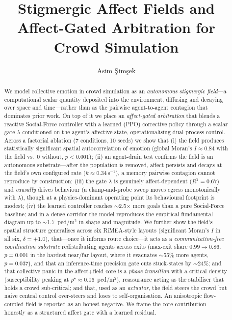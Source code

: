 \documentclass[sigconf,nonacm]{acmart}
\begin{document}
\title{Stigmergic Affect Fields and Affect-Gated Arbitration for Crowd Simulation}
\author{Asim \c{S}im\c{s}ek}
\affiliation{\institution{[Affiliation]}\country{}}
\renewcommand{\shortauthors}{\c{S}im\c{s}ek}
\begin{abstract}
We model collective emotion in crowd simulation as an \emph{autonomous stigmergic field}---a
computational scalar quantity deposited into the environment, diffusing and decaying over space and
time---rather than as the pairwise agent-to-agent contagion that dominates prior work. On top of it
we place an \emph{affect-gated arbitration} that blends a reactive Social-Force controller with a
learned (PPO) corrective policy through a scalar gate $\lambda$ conditioned on the agent's affective
state, operationalising dual-process control. Across a factorial ablation (7 conditions, 10 seeds) we
show that (i) the field produces statistically significant spatial autocorrelation of emotion (global
Moran's $I\approx0.84$ with the field vs.\ $0$ without, $p<0.001$); (ii) an agent-drain test confirms
the field is an autonomous substrate---after the population is removed, affect persists and decays at
the field's own configured rate ($k\approx0.34\,\mathrm{s}^{-1}$), a memory pairwise contagion cannot
reproduce by construction; (iii) the gate $\lambda$ is genuinely affect-dependent ($R^2=0.67$) and
\emph{causally} drives behaviour (a clamp-and-probe sweep moves egress monotonically with $\lambda$),
though at a physics-dominant operating point its behavioural footprint is modest; (iv) the learned
controller reaches $\sim$2.5$\times$ more goals than a pure Social-Force baseline; and in a dense
corridor the model reproduces the empirical fundamental diagram up to $\sim$1.7~ped/m$^2$ in shape and
magnitude. We further show the field's spatial structure generalises across six RiMEA-style layouts
(significant Moran's $I$ in all six, $\delta=+1.0$), that---once it informs route choice---it acts as
a \emph{communication-free coordination substrate} redistributing agents across exits (max-exit share
$0.99\!\to\!0.86$, $p{=}0.001$ in the hardest near/far layout, where it evacuates $\sim$55\% more
agents, $p{=}0.037$), and that an inference-time precision gate cuts stuck-states by $\sim$24\%; and that collective panic in the
affect+field core is a \emph{phase transition} with a critical density (susceptibility peaking at
$\rho^\star\!\approx\!0.06$~ped/m$^2$), reassurance acting as the stabiliser that holds a crowd
sub-critical; and that, used as an \emph{actuator}, the field steers the crowd but naive central control
over-steers and loses to self-organisation. An anisotropic flow-coupled field is reported as an honest negative. We frame the core
contribution honestly as a structured affect gate with a learned residual.
\end{abstract}
\maketitle
\end{document}
